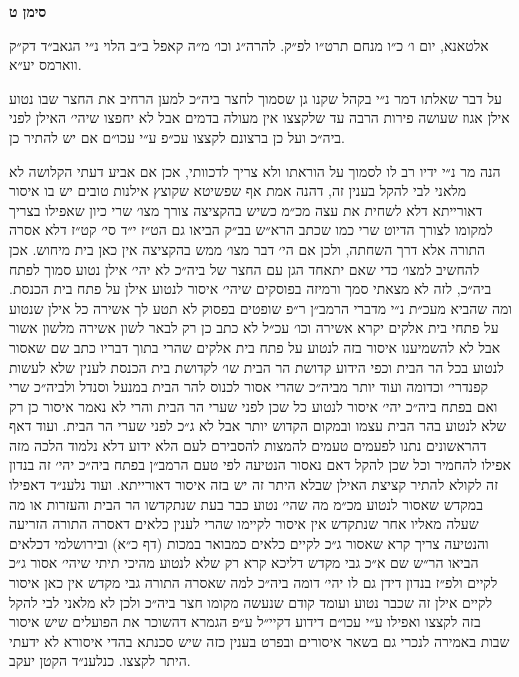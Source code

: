 \documentclass[12pt, openany]{book}
\newcommand{\chapname}{}
\newcommand{\newchap}[1]{
	\addcontentsline{toc}{chapter}{#1}
	\renewcommand{\chapname}{#1}
		\begin{center}
			\textbf{%
\fontsize{16pt}{16pt}\selectfont
				#1}
		\end{center}
}
\begin{document}
\newchap{סימן ט}
\begin{multicols}{2}
אלטאנא, יום ו׳ כ״ו מנחם תרט״ו לפ״ק. להרה״ג וכו׳ מ״ה קאפל ב״ב הלוי נ״י הגאב״ד דק״ק ווארמס יע״א.\\\vspace{0pt}

על דבר שאלתו דמר נ״י בקהל שקנו גן שסמוך לחצר ביה״כ למען הרחיב את החצר שבו נטוע אילן אגוז שעושה פירות הרבה עד שלקצצו אין מעולה בדמים אבל לא יחפצו שיהי׳ האילן לפני ביה״כ ועל כן ברצונם לקצצו עכ״פ ע״י עכו״ם אם יש להתיר כן.\\\vspace{0pt}

הנה מר נ״י ידיו רב לו לסמוך על הוראתו ולא צריך לדכוותי, אכן אם אביע דעתי הקלושה לא מלאני לבי להקל בענין זה, דהנה אמת אף שפשיטא שקוצץ אילנות טובים יש בו איסור דאורייתא דלא לשחית את עצה מכ״מ כשיש בהקציצה צורך מצו׳ שרי כיון שאפילו בצריך למקומו לצורך הדיוט שרי כמו שכתב הרא״ש בב״ק הביאו גם הט״ז י״ד סי׳ קט״ז דלא אסרה התורה אלא דרך השחתה, ולכן אם הי׳ דבר מצו׳ ממש בהקציצה אין כאן בית מיחוש. אכן להחשיב למצו׳ כדי שאם יתאחד הגן עם החצר של ביה״כ לא יהי׳ אילן נטוע סמוך לפתח ביה״כ, לזה לא מצאתי סמך ורמיזה בפוסקים שיהי׳ איסור לנטוע אילן על פתח בית הכנסת. ומה שהביא מעכ״ת נ״י מדברי הרמב״ן ר״פ שופטים בפסוק לא תטע לך אשירה כל אילן שנטוע על פתחי בית אלקים יקרא אשירה וכו׳ עכ״ל לא כתב כן רק לבאר לשון אשירה מלשון אשור אבל לא להשמיענו איסור בזה לנטוע על פתח בית אלקים שהרי בתוך דבריו כתב שם שאסור לנטוע בכל הר הבית וכפי הידוע קדושת הר הבית שו׳ לקדושת בית הכנסת לענין שלא לעשות קפנדרי׳ וכדומה ועוד יותר מביה״כ שהרי אסור לכנוס להר הבית במנעל וסנדל ולביה״כ שרי ואם בפתח ביה״כ יהי׳ איסור לנטוע כל שכן לפני שערי הר הבית והרי לא נאמר איסור כן רק שלא לנטוע בהר הבית עצמו ובמקום הקדוש יותר אבל לא ג״כ לפני שערי הר הבית. ועוד דאף דהראשונים נתנו לפעמים טעמים להמצות להסבירם לעם הלא ידוע דלא נלמוד הלכה מזה אפילו להחמיר וכל שכן להקל דאם נאסור הנטיעה לפי טעם הרמב״ן בפתח ביה״כ יהי׳ זה בנדון זה לקולא להתיר קציצת האילן שבלא היתר זה יש בזה איסור דאורייתא. ועוד נלענ״ד דאפילו במקדש שאסור לנטוע מכ״מ מה שהי׳ נטוע כבר בעת שנתקדשו הר הבית והעזרות או מה שעלה מאליו אחר שנתקדש אין איסור לקיימו שהרי לענין כלאים דאסרה התורה הזריעה והנטיעה צריך קרא שאסור ג״כ לקיים כלאים כמבואר במכות (דף כ״א) ובירושלמי דכלאים הביאו הר״ש שם א״כ גבי מקדש דליכא קרא רק שלא לנטוע מהיכי תיתי שיהי׳ אסור ג״כ לקיים ולפ״ז בנדון דידן גם לו יהי׳ דומה ביה״כ למה שאסרה התורה גבי מקדש אין כאן איסור לקיים אילן זה שכבר נטוע ועומד קודם שנעשה מקומו חצר ביה״כ ולכן לא מלאני לבי להקל בזה לקצצו ואפילו ע״י עכו״ם דידוע דקיי״ל ע״פ הגמרא דהשוכר את הפועלים שיש איסור שבות באמירה לנכרי גם בשאר איסורים ובפרט בענין כזה שיש סכנתא בהדי איסורא לא ידעתי היתר לקצצו. כנלענ״ד הקטן יעקב.\\\vspace{0pt}

\end{multicols}\newpage
\end{document}
